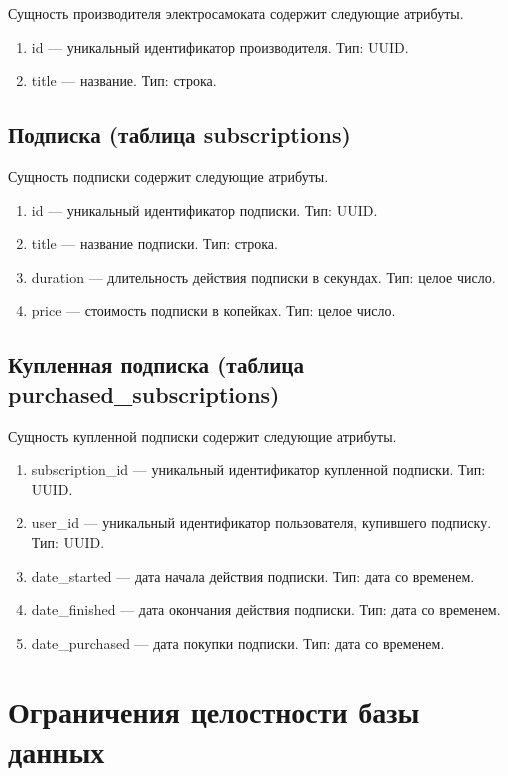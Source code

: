 Сущность производителя электросамоката содержит следующие атрибуты.

\begin{enumerate}
	\item id --- уникальный идентификатор производителя. Тип: UUID.
	\item title --- название. Тип: строка.
\end{enumerate}

\subsection*{Подписка (таблица subscriptions)}

Сущность подписки содержит следующие атрибуты.

\begin{enumerate}
	\item id --- уникальный идентификатор подписки. Тип: UUID.
	\item title --- название подписки. Тип: строка.
	\item duration --- длительность действия подписки в секундах. Тип: целое число.
	\item price --- стоимость подписки в копейках. Тип: целое число.
\end{enumerate}

\subsection*{Купленная подписка (таблица purchased\_subscriptions)}

Сущность купленной подписки содержит следующие атрибуты.

\begin{enumerate}
	\item subscription\_id --- уникальный идентификатор купленной подписки. Тип: UUID.
	\item user\_id --- уникальный идентификатор пользователя, купившего подписку. Тип:
	      UUID.
	\item date\_started --- дата начала действия подписки. Тип: дата со временем.
	\item date\_finished --- дата окончания действия подписки. Тип: дата со временем.
	\item date\_purchased --- дата покупки подписки. Тип: дата со временем.
\end{enumerate}

\section{Ограничения целостности базы данных}

